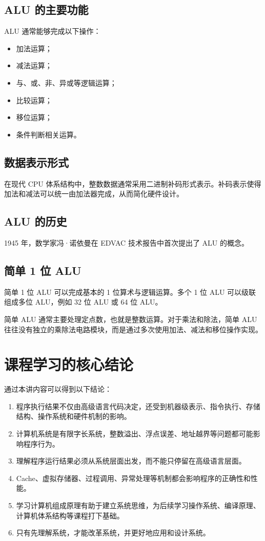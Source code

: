\documentclass[12pt,a4paper]{ctexart}
\begin{document}
\subsection{ALU 的主要功能}

ALU 通常能够完成以下操作：

\begin{itemize}
    \item 加法运算；
    \item 减法运算；
    \item 与、或、非、异或等逻辑运算；
    \item 比较运算；
    \item 移位运算；
    \item 条件判断相关运算。
\end{itemize}

\subsection{数据表示形式}

在现代 CPU 体系结构中，整数数据通常采用二进制补码形式表示。补码表示使得加法和减法可以统一由加法器完成，从而简化硬件设计。

\subsection{ALU 的历史}

1945 年，数学家冯·诺依曼在 EDVAC 技术报告中首次提出了 ALU 的概念。

\subsection{简单 1 位 ALU}

简单 1 位 ALU 可以完成基本的 1 位算术与逻辑运算。多个 1 位 ALU 可以级联组成多位 ALU，例如 32 位 ALU 或 64 位 ALU。

简单 ALU 通常主要处理定点数，也就是整数运算。对于乘法和除法，简单 ALU 往往没有独立的乘除法电路模块，而是通过多次使用加法、减法和移位操作实现。

\section{课程学习的核心结论}

通过本讲内容可以得到以下结论：

\begin{enumerate}
    \item 程序执行结果不仅由高级语言代码决定，还受到机器级表示、指令执行、存储结构、操作系统和硬件机制的影响。
    \item 计算机系统是有限字长系统，整数溢出、浮点误差、地址越界等问题都可能影响程序行为。
    \item 理解程序运行结果必须从系统层面出发，而不能只停留在高级语言层面。
    \item Cache、虚拟存储器、过程调用、异常处理等机制都会影响程序的正确性和性能。
    \item 学习计算机组成原理有助于建立系统思维，为后续学习操作系统、编译原理、计算机体系结构等课程打下基础。
    \item 只有先理解系统，才能改革系统，并更好地应用和设计系统。
\end{enumerate}
\end{document}
